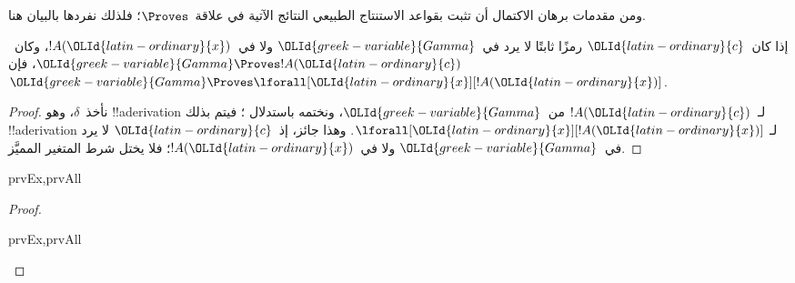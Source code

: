 \documentclass[../../../include/open-logic-section]{subfiles}
\begin{document}


\begin{explain}
  ومن مقدمات برهان الاكتمال أن تثبت بقواعد الاستنتاج الطبيعي
  النتائج الآتية في علاقة~$\Proves$؛ فلذلك نفردها بالبيان هنا.
\end{explain}

\begin{thm}
 إذا كان~${\OLId{latin-ordinary}{c}}$ رمزًا ثابتًا لا يرد
في~${\OLId{greek-variable}{Gamma}}$ ولا في~$!A({\OLId{latin-ordinary}{x}})$، وكان~${\OLId{greek-variable}{Gamma}} \Proves !A({\OLId{latin-ordinary}{c}})$، فإن
${\OLId{greek-variable}{Gamma}} \Proves \lforall[{\OLId{latin-ordinary}{x}}][!A({\OLId{latin-ordinary}{x}})]$.
\end{thm}

\begin{proof}
نأخذ~$\delta$، وهو !!a{derivation} لـ~$!A({\OLId{latin-ordinary}{c}})$ من~${\OLId{greek-variable}{Gamma}}$، ونختمه
باستدلال \Intro{\lforall}؛ فيتم بذلك !!a{derivation} لـ
$\lforall[{\OLId{latin-ordinary}{x}}][!A({\OLId{latin-ordinary}{x}})]$. وهذا جائز، إذ~${\OLId{latin-ordinary}{c}}$ لا يرد في~${\OLId{greek-variable}{Gamma}}$ ولا
في~$!A({\OLId{latin-ordinary}{x}})$؛ فلا يختل شرط المتغير المميَّز.
\end{proof}

\begin{prop}
\begin{tagenumerate}{prvEx,prvAll}

\end{tagenumerate}
\end{prop}

\begin{proof}
\begin{tagenumerate}{prvEx,prvAll}

\end{tagenumerate}
\end{proof}
\end{document}
